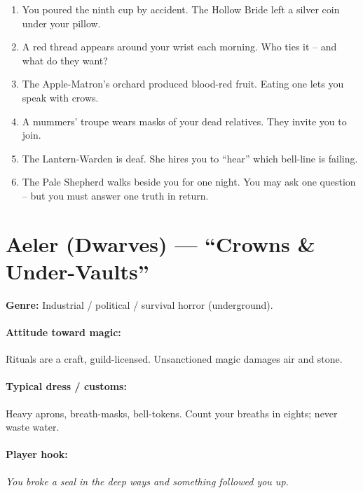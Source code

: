 \begin{tcolorbox}[colback=gray!5!white, colframe=gray!70!black, title=Aelaerem Mini-Generator (d6),breakable]
\begin{enumerate}
\item You poured the ninth cup by accident. The Hollow Bride left a silver coin under your pillow.
\item A red thread appears around your wrist each morning. Who ties it -- and what do they want?
\item The Apple-Matron's orchard produced blood-red fruit. Eating one lets you speak with crows.
\item A mummers' troupe wears masks of your dead relatives. They invite you to join.
\item The Lantern-Warden is deaf. She hires you to ``hear'' which bell-line is failing.
\item The Pale Shepherd walks beside you for one night. You may ask one question -- but you must answer one truth in return.
\end{enumerate}
\end{tcolorbox}

\section{Aeler (Dwarves) --- ``Crowns \& Under-Vaults''}
\textbf{Genre:} Industrial / political / survival horror (underground).

\paragraph{Attitude toward magic:} Rituals are a craft, guild-licensed. Unsanctioned magic damages air and stone.

\paragraph{Typical dress / customs:} Heavy aprons, breath-masks, bell-tokens. Count your breaths in eights; never waste water.

\paragraph{Player hook:} \emph{You broke a seal in the deep ways and something followed you up.}

